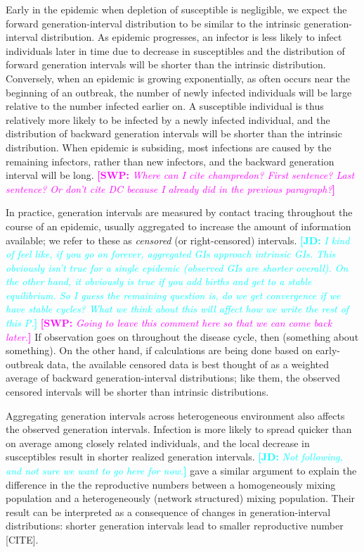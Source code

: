 \documentclass[12pt]{article}
\newcommand{\comment}[3]{\textcolor{#1}{\textbf{[#2: }\textsl{#3}\textbf{]}}}
\newcommand{\jd}[1]{\comment{cyan}{JD}{#1}}
\newcommand{\swp}[1]{\comment{magenta}{SWP}{#1}}
\begin{document}
Early in the epidemic when depletion of susceptible is negligible, we expect the forward generation-interval distribution to be similar to the intrinsic generation-interval distribution.
As epidemic progresses, an infector is less likely to infect individuals later in time due to decrease in susceptibles and the distribution of forward generation intervals will be shorter than the intrinsic distribution.
Conversely, when an epidemic is growing exponentially, as often occurs near the beginning of an outbreak, the number of newly infected individuals will be large relative to the number infected earlier on. 
A susceptible individual is thus relatively more likely to be infected by a newly infected individual, and the distribution of backward generation intervals will be shorter than the intrinsic distribution.
When epidemic is subsiding, most infections are caused by the remaining infectors, rather than new infectors, and the backward generation interval will be long.
\swp{Where can I cite champredon? First sentence? Last sentence? Or don't cite DC because I already did in the previous paragraph?}

In practice, generation intervals are measured by contact tracing throughout the course of an epidemic, usually aggregated to increase the amount of information available; we refer to these as \emph{censored} (or right-censored) intervals.
\jd{I kind of feel like, if you go on forever, aggregated GIs approach intrinsic GIs. This obviously isn't true for a single epidemic (observed GIs are shorter overall). On the other hand, it obviously \emph{is} true if you add births and get to a stable equilibrium. So I guess the remaining question is, do we get convergence if we have stable cycles? What we think about this will affect how we write the rest of this P.} \swp{Going to leave this comment here so that we can come back later.}
If observation goes on throughout the disease cycle, then (something about something).
On the other hand, if calculations are being done based on early-outbreak data, the available censored data is best thought of as a weighted average of backward generation-interval distributions; like them, the observed censored intervals will be shorter than intrinsic distributions.

Aggregating generation intervals across heterogeneous environment also affects the observed generation intervals.
Infection is more likely to spread quicker than on average among closely related individuals, and the local decrease in susceptibles result in shorter realized generation intervals. \jd{Not following, and not sure we want to go here for now.}
\cite{trapman2016inferring} gave a similar argument to explain the difference in the the reproductive numbers between a homogeneously mixing population and a heterogeneously (network structured) mixing population.
Their result can be interpreted as a consequence of changes in generation-interval distributions: shorter generation intervals lead to smaller reproductive number [CITE]. 
\end{document}
